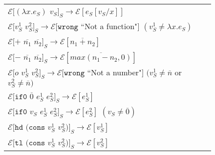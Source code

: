 \begin{figure}[ph!]
\centering
\begin{tabular}{l}
$\mathscr{E}[(\lambda x.e_{S})$ $v_{S}]_{S}\rightarrow\mathscr{E}[e_{S}[v_{S}/x]]$ \\

\vspace{5pt}

$\mathscr{E}[v_{S}^{1}$ $v_{S}^{2}]_{S}\rightarrow\mathscr{E}[\mathtt{wrong}$ ``Not a function"$]$ $(v_{S}^{1}\neq\lambda x.e_{S})$ \\

\vspace{5pt}

$\mathscr{E}[+$ $\overline{n_{1}}$ $\overline{n_{2}}]_{S}\rightarrow\mathscr{E}[\overline{n_{1}+n_{2}}]$ \\

\vspace{5pt}

$\mathscr{E}[-$ $\overline{n_{1}}$ $\overline{n_{2}}]_{S}\rightarrow\mathscr{E}[\overline{max(n_{1}-n_{2},0)}]$ \\

\vspace{5pt}

$\mathscr{E}[o$ $v_{S}^{1}$ $v_{S}^{2}]_{S}\rightarrow\mathscr{E}[\mathtt{wrong}$ ``Not a number"$]$ $(v_{S}^{1}\neq\overline{n}$ or $v_{S}^{2}\neq\overline{n})$ \\

\vspace{5pt}

$\mathscr{E}[\mathtt{if0}$ $\overline{0}$ $e_{S}^{1}$ $e_{S}^{2}]_{S}\rightarrow\mathscr{E}[e_{S}^{1}]$ \\

\vspace{5pt}

$\mathscr{E}[\mathtt{if0}$ $v_{S}$ $e_{S}^{1}$ $e_{S}^{2}]_{S}\rightarrow\mathscr{E}[e_{S}^{2}]$ $(v_{S}\neq\overline{0})$ \\

\vspace{5pt}

$\mathscr{E}[\mathtt{hd}$ $(\mathtt{cons}$ $v_{S}^{1}$ $v_{S}^{2})]_{S}\rightarrow\mathscr{E}[v_{S}^{1}]$ \\

\vspace{5pt}

$\mathscr{E}[\mathtt{tl}$ $(\mathtt{cons}$ $v_{S}^{1}$ $v_{S}^{2})]_{S}\rightarrow\mathscr{E}[v_{S}^{2}]$ \\


\end{tabular}
\end{figure}
